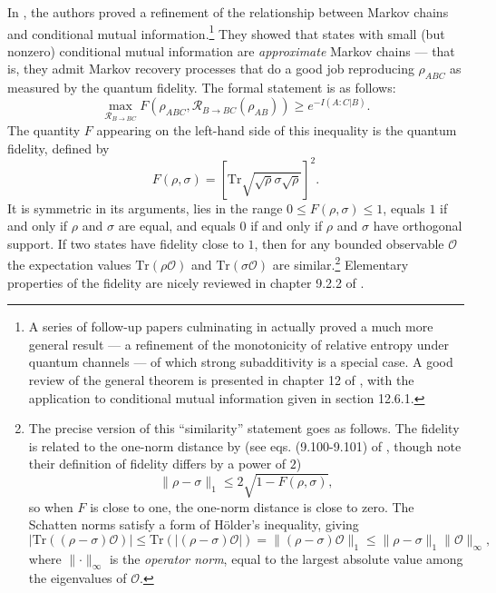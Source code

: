 \documentclass[a4paper,11pt]{article}
\renewcommand{\tr}{\text{Tr}}
\begin{document}
In \cite{fawzi2015quantum}, the authors proved a refinement of the relationship between Markov chains and conditional mutual information.\footnote{A series of follow-up papers culminating in \cite{junge2018universal} actually proved a much more general result --- a refinement of the monotonicity of relative entropy under quantum channels --- of which strong subadditivity is a special case. A good review of the general theorem is presented in chapter 12 of \cite{WildeBook}, with the application to conditional mutual information given in section 12.6.1.} They showed that states with small (but nonzero) conditional mutual information are \emph{approximate} Markov chains --- that is, they admit Markov recovery processes that do a good job reproducing $\rho_{ABC}$ as measured by the quantum fidelity. The formal statement is as follows:
\begin{equation} \label{eq:first-fidelity-inequality}
    \max_{\mathcal{R}_{B \rightarrow BC}} F(\rho_{ABC}, \mathcal{R}_{B \rightarrow B C}(\rho_{AB})) \geq e^{-I(A:C|B)}. 
\end{equation}
The quantity $F$ appearing on the left-hand side of this inequality is the quantum fidelity, defined by
\begin{equation}
    F(\rho, \sigma) = \left[ \tr\sqrt{\sqrt{\rho} \sigma \sqrt{\rho}} \right]^2.
\end{equation}
It is symmetric in its arguments, lies in the range $0 \leq F(\rho, \sigma) \leq 1$, equals $1$ if and only if $\rho$ and $\sigma$ are equal, and equals $0$ if and only if $\rho$ and $\sigma$ have orthogonal support. If two states have fidelity close to $1$, then for any bounded observable $\mathcal{O}$ the expectation values $\tr(\rho \mathcal{O})$ and $\tr(\sigma \mathcal{O})$ are similar.\footnote{The precise version of this ``similarity'' statement goes as follows. The fidelity is related to the one-norm distance by (see eqs. (9.100-9.101) of \cite{nielsen-chuang}, though note their definition of fidelity differs by a power of $2$)
\begin{equation*}
   \lVert \rho - \sigma \rVert_1 \leq 2 \sqrt{1 - F(\rho, \sigma)},
\end{equation*}
so when $F$ is close to one, the one-norm distance is close to zero. The Schatten norms satisfy a form of H\"{o}lder's inequality, giving
\begin{equation*}
    |\tr\left((\rho - \sigma) \mathcal{O}\right)| \leq \tr\left( \left|(\rho - \sigma) \mathcal{O} \right| \right) = \lVert (\rho - \sigma) \mathcal{O} \rVert_1 \leq \lVert \rho - \sigma \rVert_1 \lVert \mathcal{O} \rVert_{\infty},
\end{equation*}
where $\lVert \cdot \rVert_{\infty}$ is the \emph{operator norm}, equal to the largest absolute value among the eigenvalues of $\mathcal{O}.$} Elementary properties of the fidelity are nicely reviewed in chapter 9.2.2 of \cite{nielsen-chuang}.
\end{document}
